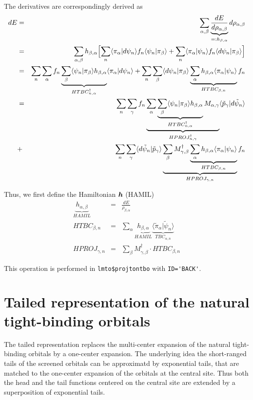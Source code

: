 \documentclass[11pt,a4paper]{report}
\begin{document}
The derivatives are correspondingly derived as 
\begin{eqnarray}
dE&=&\sum_{\alpha,\beta}\underbrace{\frac{dE}{d\rho_{\alpha,\beta}}}
_{=:h_{\beta,\alpha}}d\rho_{\alpha,\beta}
\nonumber\\
&=&\sum_{\alpha,\beta}h_{\beta,\alpha}
\Bigl[
\sum_n\langle\pi_\alpha|d\psi_n\rangle f_n\langle\psi_n|\pi_\beta\rangle
+\sum_n\langle\pi_\alpha|\psi_n\rangle f_n\langle{d}\psi_n|\pi_\beta\rangle
\Bigr]
\nonumber\\
&=&\sum_n\sum_{\alpha}
f_n
\underbrace{\sum_{\beta}
\langle\psi_n|\pi_\beta\rangle h_{\beta,\alpha}}_{HTBC^\dagger_{n,\alpha}}
\langle\pi_\alpha|d\psi_n\rangle 
+
\sum_n\sum_{\beta}
\langle{d}\psi_n|\pi_\beta\rangle 
\underbrace{\sum_{\alpha}h_{\beta,\alpha} \langle\pi_\alpha|\psi_n\rangle}_{HTBC_{\beta,n}} f_n
\nonumber\\
&=&\sum_n\sum_{\gamma}
f_n
\underbrace{\sum_{\alpha}
\underbrace{\sum_{\beta}
\langle\psi_n|\pi_\beta\rangle h_{\beta,\alpha}}_{HTBC^\dagger_{n,\alpha}}
M_{\alpha,\gamma}}_{HPROJ^\dagger_{n,\gamma}}
\langle\tilde{p}_\gamma|d\tilde{\psi}_n\rangle 
\nonumber\\
&+&
\sum_n\sum_{\gamma}
\langle{d}\tilde{\psi}_n|\tilde{p}_\gamma\rangle 
\underbrace{
\sum_{\beta}M^\dagger_{\gamma,\beta}
\underbrace{\sum_{\alpha}h_{\beta,\alpha} \langle\pi_\alpha|\psi_n\rangle}_{HTBC_{\beta,n}}}_{HPROJ_{\gamma,n}} f_n
\end{eqnarray}

Thus, we first define the Hamiltonian $\bm{h}$ (HAMIL) 
\begin{eqnarray}
\underbrace{h_{\alpha,\beta}}_{HAMIL}&=&\frac{dE}{\rho_{\beta,\alpha}}
\nonumber\\
HTBC_{\beta,n}&=&
\sum_\alpha \underbrace{h_{\beta,\alpha}}_{HAMIL}
\underbrace{\langle\tilde{\pi}_\alpha|\tilde{\psi}_n\rangle}_{TBC_{\alpha,n}}
\nonumber\\
HPROJ_{\gamma,n}&=&\sum_\beta M^\dagger_{\gamma,\beta}\cdot HTBC_{\beta,n}
\end{eqnarray}


This operation is performed in
\verb|lmto$projtontbo| with \verb|ID='BACK'|.

\section{Tailed representation of the natural tight-binding orbitals}
The tailed representation replaces the multi-center expansion of the
natural tight-binding orbitals by a one-center expansion. The
underlying idea the short-ranged tails of the screened orbitals can be
approximatd by exponential tails, that are matched to the one-center
expansion of the orbitals at the central site. Thus both the head and
the tail functions centered on the central site are extended by a
superposition of exponential tails.
\end{document}

